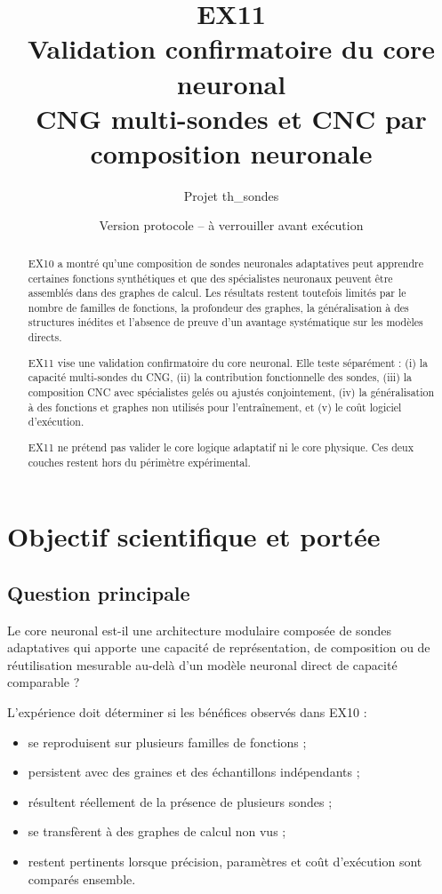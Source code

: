 \documentclass[11pt,a4paper]{article}
\title{
  \textbf{EX11}\\
  Validation confirmatoire du core neuronal\\
  \large CNG multi-sondes et CNC par composition neuronale
}
\author{Projet th\_sondes}
\date{Version protocole -- à verrouiller avant exécution}
\begin{document}
\maketitle

\begin{abstract}
EX10 a montré qu'une composition de sondes neuronales adaptatives
peut apprendre certaines fonctions synthétiques et que des spécialistes
neuronaux peuvent être assemblés dans des graphes de calcul.
Les résultats restent toutefois limités par le nombre de familles de
fonctions, la profondeur des graphes, la généralisation à des structures
inédites et l'absence de preuve d'un avantage systématique sur les
modèles directs.

EX11 vise une validation confirmatoire du core neuronal.
Elle teste séparément : (i) la capacité multi-sondes du CNG,
(ii) la contribution fonctionnelle des sondes,
(iii) la composition CNC avec spécialistes gelés ou ajustés conjointement,
(iv) la généralisation à des fonctions et graphes non utilisés pour
l'entraînement, et (v) le coût logiciel d'exécution.

EX11 ne prétend pas valider le core logique adaptatif ni le core physique.
Ces deux couches restent hors du périmètre expérimental.
\end{abstract}

\tableofcontents
\newpage

\section{Objectif scientifique et portée}

\subsection{Question principale}

Le core neuronal est-il une architecture modulaire composée de sondes
adaptatives qui apporte une capacité de représentation, de composition
ou de réutilisation mesurable au-delà d'un modèle neuronal direct
de capacité comparable ?

L'expérience doit déterminer si les bénéfices observés dans EX10 :
\begin{itemize}
  \item se reproduisent sur plusieurs familles de fonctions ;
  \item persistent avec des graines et des échantillons indépendants ;
  \item résultent réellement de la présence de plusieurs sondes ;
  \item se transfèrent à des graphes de calcul non vus ;
  \item restent pertinents lorsque précision, paramètres et coût
        d'exécution sont comparés ensemble.
\end{itemize}
\end{document}
